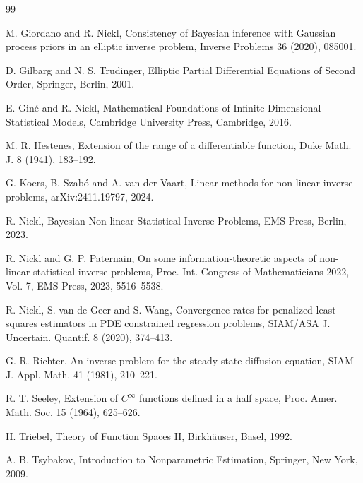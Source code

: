 \documentclass[11pt]{article}
\numberwithin{equation}{section}
\begin{document}
\begin{thebibliography}{99}

M. Giordano and R. Nickl,
Consistency of Bayesian inference with Gaussian process priors in an
elliptic inverse problem,
Inverse Problems 36 (2020), 085001.

D. Gilbarg and N. S. Trudinger,
Elliptic Partial Differential Equations of Second Order,
Springer, Berlin, 2001.

E. Gin\'e and R. Nickl,
Mathematical Foundations of Infinite-Dimensional Statistical Models,
Cambridge University Press, Cambridge, 2016.

M. R. Hestenes,
Extension of the range of a differentiable function,
Duke Math. J. 8 (1941), 183--192.

G. Koers, B. Szab\'o and A. van der Vaart,
Linear methods for non-linear inverse problems,
arXiv:2411.19797, 2024.

R. Nickl,
Bayesian Non-linear Statistical Inverse Problems,
EMS Press, Berlin, 2023.

R. Nickl and G. P. Paternain,
On some information-theoretic aspects of non-linear statistical
inverse problems,
Proc. Int. Congress of Mathematicians 2022, Vol. 7, EMS Press, 2023,
5516--5538.

R. Nickl, S. van de Geer and S. Wang,
Convergence rates for penalized least squares estimators in PDE
constrained regression problems,
SIAM/ASA J. Uncertain. Quantif. 8 (2020), 374--413.

G. R. Richter,
An inverse problem for the steady state diffusion equation,
SIAM J. Appl. Math. 41 (1981), 210--221.

R. T. Seeley,
Extension of $C^\infty$ functions defined in a half space,
Proc. Amer. Math. Soc. 15 (1964), 625--626.

H. Triebel,
Theory of Function Spaces II,
Birkh\"auser, Basel, 1992.

A. B. Tsybakov,
Introduction to Nonparametric Estimation,
Springer, New York, 2009.

\end{thebibliography}
\end{document}
